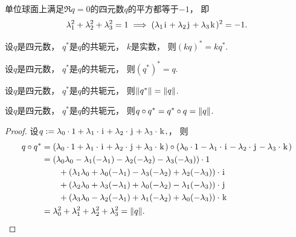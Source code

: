 \begin{property}
单位球面上满足\(\Re q = 0\)的四元数\(q\)的平方都等于\(-1\)，
即\begin{equation*}
	\lambda_1^2 + \lambda_2^2 + \lambda_3^2 = 1
	\implies
	(\lambda_1 \kern1pt\mathrm{i}\kern1pt + \lambda_2 \kern1pt\mathrm{j}\kern1pt + \lambda_3 \kern1pt\mathrm{k}\kern1pt)^2 = -1.
\end{equation*}
\end{property}

\begin{property}
设\(q\)是四元数，
\(q^*\)是\(q\)的共轭元，
\(k\)是实数，
则\((k q)^* = k q^*\).
\end{property}

\begin{property}
设\(q\)是四元数，
\(q^*\)是\(q\)的共轭元，
则\((q^*)^* = q\).
\end{property}

\begin{property}
设\(q\)是四元数，
\(q^*\)是\(q\)的共轭元，
则\(\norm{q^*} = \norm{q}\).
\end{property}

\begin{property}
设\(q\)是四元数，
\(q^*\)是\(q\)的共轭元，
则\(q \circ q^* = q^* \circ q = \norm{q}\).
\begin{proof}
设\(
	q
	:=
	\lambda_0 \cdot 1
	+ \lambda_1 \cdot \kern1pt\mathrm{i}\kern1pt
	+ \lambda_2 \cdot \kern1pt\mathrm{j}\kern1pt
	+ \lambda_3 \cdot \kern1pt\mathrm{k}\kern1pt,
\)，
则\begin{align*}
	q \circ q^*
	&= (
		\lambda_0 \cdot 1
		+ \lambda_1 \cdot \kern1pt\mathrm{i}\kern1pt
		+ \lambda_2 \cdot \kern1pt\mathrm{j}\kern1pt
		+ \lambda_3 \cdot \kern1pt\mathrm{k}\kern1pt
	) \circ (
		\lambda_0 \cdot 1
		- \lambda_1 \cdot \kern1pt\mathrm{i}\kern1pt
		- \lambda_2 \cdot \kern1pt\mathrm{j}\kern1pt
		- \lambda_3 \cdot \kern1pt\mathrm{k}\kern1pt
	) \\
	&=
		(\lambda_0 \lambda_0 - \lambda_1 (- \lambda_1) - \lambda_2 (- \lambda_2) - \lambda_3 (- \lambda_3)) \cdot 1 \\
		&\hspace{20pt}
			+ (\lambda_1 \lambda_0 + \lambda_0 (- \lambda_1) - \lambda_3 (- \lambda_2) + \lambda_2 (- \lambda_3)) \cdot \kern1pt\mathrm{i}\kern1pt \\
		&\hspace{20pt}
			+ (\lambda_2 \lambda_0 + \lambda_3 (- \lambda_1) + \lambda_0 (- \lambda_2) - \lambda_1 (- \lambda_3)) \cdot \kern1pt\mathrm{j}\kern1pt \\
		&\hspace{20pt}
			+ (\lambda_3 \lambda_0 - \lambda_2 (- \lambda_1) + \lambda_1 (- \lambda_2) + \lambda_0 (- \lambda_3)) \cdot \kern1pt\mathrm{k}\kern1pt \\
	&= \lambda_0^2 + \lambda_1^2 + \lambda_2^2 + \lambda_3^2
	= \norm{q}.
	\qedhere
\end{align*}
\end{proof}
\end{property}

